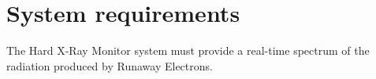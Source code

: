 \section{System requirements}

The Hard X-Ray Monitor system must provide a real-time 
spectrum of the radiation produced by Runaway Electrons.
